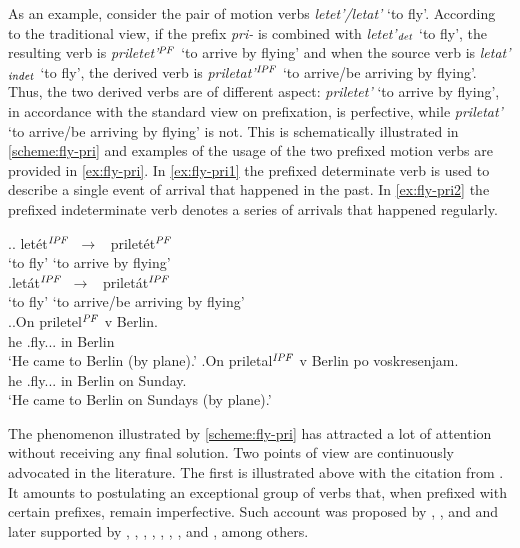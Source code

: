 
As an example, consider the pair of motion verbs \textit{letet'/letat'} `to fly'. According to the traditional view, if the prefix \textit{pri-} is combined with \textit{letet'}$_{\mathit{det}}$ `to fly', the resulting verb is \textit{priletet'}$^{\mathit{PF}}$ `to arrive by flying' and when the source verb is \textit{letat'}$_{\mathit{indet}}$ `to fly', the derived verb is \textit{priletat'}$^{\mathit{IPF}}$ `to arrive/be arriving by flying'. Thus, the two derived verbs are of different aspect: \textit{priletet'} `to arrive by flying', in accordance with the standard view on prefixation, is perfective, while \textit{priletat'} `to arrive/be arriving by flying' is not. This is schematically illustrated in \ref{scheme:fly-pri} and examples of the usage of the two prefixed motion verbs are provided in \ref{ex:fly-pri}. In \ref{ex:fly-pri1} the prefixed determinate verb is used to describe a single event of arrival that happened in the past. In \ref{ex:fly-pri2} the prefixed indeterminate verb denotes a series of arrivals that happened regularly.

\ex.\label{scheme:fly-pri}\ag. let\'{e}t$^{\mathit{IPF}}$~$\to$~ prilet\'{e}t$^{\mathit{PF}}$\\
{`to fly'} {`to arrive by flying'}\\
\bg.let\'{a}t$^{\mathit{IPF}}$~$\to$~ prilet\'{a}t$^{\mathit{IPF}}$\\
{`to fly'} {`to arrive/be arriving by flying'}\\

\ex.\label{ex:fly-pri}\ag.\label{ex:fly-pri1}On priletel$^{\mathit{PF}}$ v Berlin.\\
he .fly... in Berlin\\
\vspace{0.5em}
`He came to Berlin (by plane).'
\bg.\label{ex:fly-pri2}On priletal$^{\mathit{IPF}}$ v Berlin po voskresenjam.\\
he .fly... in Berlin on Sunday.\\
\vspace{0.5em}
`He came to Berlin on Sundays (by plane).'

The phenomenon illustrated by \ref{scheme:fly-pri} has attracted a lot of attention without receiving any final solution. Two points of view are continuously advocated in the literature. The first is illustrated above with the citation from \citet{Titelbaum:90}. It amounts to postulating an exceptional group of verbs that, when prefixed with certain prefixes, remain imperfective. Such account was proposed by \citet[46]{Meillet:1902}, \citet[5]{Mazon:1908}, and \citet{Vondrak:1908} and later supported by \citet{Shaxmatov:41}, \citet{Gvozdev:73}, \citet{Vinogradov:72}, \citet{Townsend:75}, \citet{Shvedova:82}, \citet{Wade:92}, \citet{Nesset:08}, and \citet{Janda:10}, among others. 

